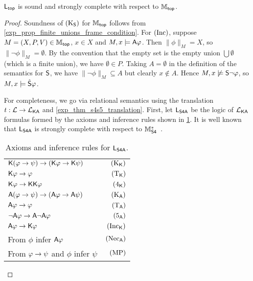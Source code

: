\begin{theorem}
\label{exp_thm_mtop_axiomatisation}
    $\sLtop$ is sound and strongly complete with respect to $\Mtop$.
\end{theorem}

\begin{proof}
    Soundness of $\Ksoundness$ for $\Mtop$ follows from
    \cref{exp_prop_finite_unions_frame_condition}. For $\inc$, suppose $M = (X, P,
    V) \in \Mtop$, $x \in X$ and $M, x \models \A\phi$. Then $\|\phi\|_M = X$,
    so $\|\neg\phi\|_M = \emptyset$. By the convention that the empty set is
    the empty union $\bigcup\emptyset$ (which is a finite union), we have
    $\emptyset \in P$. Taking $A = \emptyset$ in the definition of the
    semantics for $\S$, we have $\|\neg\phi\|_M \subseteq A$ but clearly $x
    \notin A$. Hence $M, x \not\models \S\neg\phi$, so $M, x \models
    \hat\S\phi$.


For completeness, we go via relational
semantics using the translation $t: \cL \to \cLKA$ and
\cref{exp_thm_s4s5_translation}. First, let $\sLsfoura$ be the logic of $\cLKA$
formulas formed by the axioms and inference rules shown in
\cref{exp_tab_axioms_sfoura}. It is well known that $\sLsfoura$ is strongly
complete with respect to $\Msfour$~\cite[Theorem 7.2]{blackburn2002modal}.

\begin{table}[h]
    \centering
    \caption{Axioms and inference rules for $\sLsfoura$.}
    \begin{tabular}{lr}
        \toprule
       $\K(\phi \limplies \psi) \limplies (\K\phi \limplies \K\psi)$
           & $\Kk$ \\
       $\K\phi \limplies \phi$
           & $\Tk$ \\
       $\K\phi \limplies \K\K\phi$
           & $\fourk$ \\
       \midrule
       $\A(\phi \limplies \psi) \limplies (\A\phi \limplies \A\psi)$
           & $\Kuniv$ \\
       $\A\phi \limplies \phi$
           & $\Tuniv$ \\
       $\neg\A\phi \limplies \A\neg\A\phi$
           & $\fiveuniv$ \\
       \midrule
       $\A\phi \limplies \K\phi$
           & $\inck$ \\
       \midrule
       From $\phi$ infer $\A\phi$
           & $\necuniv$ \\
       From $\phi \limplies \psi$ and $\phi$ infer $\psi$
           & $\modpon$ \\
        \bottomrule
    \end{tabular}
    \label{exp_tab_axioms_sfoura}
\end{table}


\end{proof}
